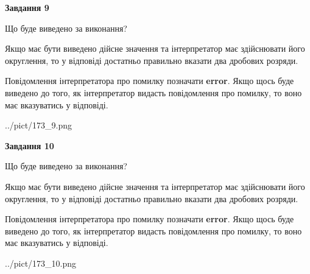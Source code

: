 \documentclass[12pt, ukrainian]{article}
\begin{document}
{\begin {Large}
{\begin {center}\textbf{Завдання 9}\end {center}}\par
Що буде виведено за виконання? \par

Якщо має бути виведено дійсне значення та інтерпретатор має здійснювати його округлення, 
то у відповіді достатньо правильно вказати два дробових розряди.

Повідомлення інтерпретатора про помилку позначати \textbf{error}.
Якщо щось буде виведено до того, як інтерпретатор видасть повідомлення про помилку, 
то воно має вказуватись у відповіді. \par

\begin{center}
	{../pict/173_9.png}
\end{center}
\newpage

{\begin {center}\textbf{Завдання 10}\end {center}}\par
Що буде виведено за виконання? \par

Якщо має бути виведено дійсне значення та інтерпретатор має здійснювати його округлення, 
то у відповіді достатньо правильно вказати два дробових розряди.

Повідомлення інтерпретатора про помилку позначати \textbf{error}.
Якщо щось буде виведено до того, як інтерпретатор видасть повідомлення про помилку, 
то воно має вказуватись у відповіді. \par

\begin{center}
	{../pict/173_10.png}
\end{center}
\newpage

\end {Large}}
\end{document}
